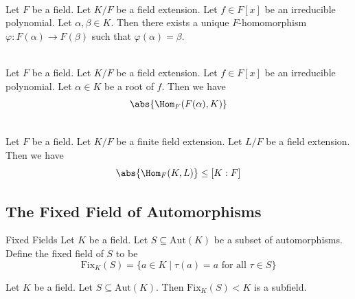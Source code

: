 \documentclass[a4paper]{article}
\begin{document}
\begin{prp}{}{}\\
Let $F$ be a field. Let $K/F$ be a field extension. Let $f\in F[x]$ be an irreducible polynomial. Let $\alpha,\beta\in K$. Then there exists a unique $F$-homomorphism $\varphi:F(\alpha)\to F(\beta)$ such that $\varphi(\alpha)=\beta$. 
\end{prp}

\begin{prp}{}{}\\
Let $F$ be a field. Let $K/F$ be a field extension. Let $f\in F[x]$ be an irreducible polynomial. Let $\alpha\in K$ be a root of $f$. Then we have $$\abs{\Hom_F(F(\alpha),K)}$$
\end{prp}

\begin{prp}{}{}\\
Let $F$ be a field. Let $K/F$ be a finite field extension. Let $L/F$ be a field extension. Then we have $$\abs{\Hom_F(K,L)}\leq[K:F]$$
\end{prp}
\subsection{The Fixed Field of Automorphisms}
\begin{defn}{Fixed Fields}{} Let $K$ be a field. Let $S\subseteq\text{Aut}(K)$ be a subset of automorphisms. Define the fixed field of $S$ to be $$\text{Fix}_K(S)=\{a\in K\;|\;\tau(a)=a\text{ for all }\tau\in S\}$$
\end{defn}

\begin{lmm}{}{} Let $K$ be a field. Let $S\subseteq\text{Aut}(K)$. Then $\text{Fix}_K(S)<K$ is a subfield. 
\end{lmm}
\end{document}
